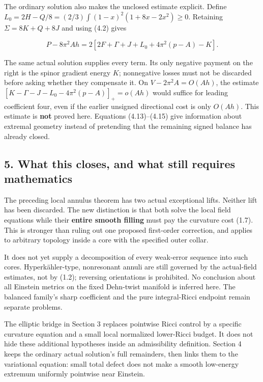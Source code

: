 \documentclass[
  10pt,
]{article}
\begin{document}
The ordinary solution also makes the unclosed estimate explicit. Define
\(L_0=2H-Q/8=(2/3)\int(1-x)^2(1+8x-2x^2)\ge0\). Retaining
\(\Sigma=8K+Q+8J\) and using (4.2) gives

\[
 \boxed{P-8\pi^2Ah
        =2[2F+\Gamma+J+L_0+4\pi^2(p-A)-K].}          \tag{4.16}
\]

The same actual solution supplies every term. Its only negative payment
on the right is the spinor gradient energy \(K\); nonnegative losses
must not be discarded before asking whether they compensate it. On
\(V-2\pi^2A=O(Ah)\), the estimate
\([K-\Gamma-J-L_0-4\pi^2(p-A)]_+=o(Ah)\) would suffice for leading
coefficient four, even if the earlier unsigned directional cost is only
\(O(Ah)\). This estimate is \textbf{not} proved here. Equations
(4.13)--(4.15) give information about extremal geometry instead of
pretending that the remaining signed balance has already closed.

\hypertarget{what-this-closes-and-what-still-requires-mathematics}{%
\subsection{5. What this closes, and what still requires
mathematics}\label{what-this-closes-and-what-still-requires-mathematics}}

The preceding local annulus theorem has two actual exceptional lifts.
Neither lift has been discarded. The new distinction is that both solve
the local field equations while their \textbf{entire smooth filling}
must pay the curvature cost (1.7). This is stronger than ruling out one
proposed first-order correction, and applies to arbitrary topology
inside a core with the specified outer collar.

It does not yet supply a decomposition of every weak-error sequence into
such cores. Hyperkähler-type, nonresonant annuli are still governed by
the actual-field estimates, not by (1.2); reversing orientations is
prohibited. No conclusion about all Einstein metrics on the fixed
Dehn-twist manifold is inferred here. The balanced family's sharp
coefficient and the pure integral-Ricci endpoint remain separate
problems.

The elliptic bridge in Section 3 replaces pointwise Ricci control by a
specific curvature equation and a small local normalized lower-Ricci
budget. It does not hide these additional hypotheses inside an
admissibility definition. Section 4 keeps the ordinary actual solution's
full remainders, then links them to the variational equation: small
total defect does not make a smooth low-energy extremum uniformly
pointwise near Einstein.
\end{document}
